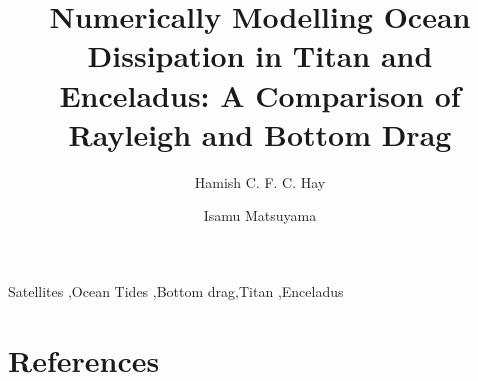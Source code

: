 \documentclass[preprint,5p,times,authoryear]{elsarticle}
\begin{document}
\hypersetup{
     allcolors = MidnightBlue
}


\begin{frontmatter}

\title{Numerically Modelling Ocean Dissipation in Titan and Enceladus: A Comparison of Rayleigh and Bottom Drag}

\author[label1]{Hamish C. F. C. Hay}
\author[label1]{Isamu Matsuyama}
\address[label1]{Lunar and Planetary Laboratory, University of Arizona, Tucson, AZ 85719, United States}


\begin{keyword}
Satellites \sep Ocean Tides \sep Bottom drag\sep Titan \sep Enceladus 
\end{keyword}

\begin{abstract}



\end{abstract}
\end{frontmatter}








%



\section*{References}


%
\end{document}
